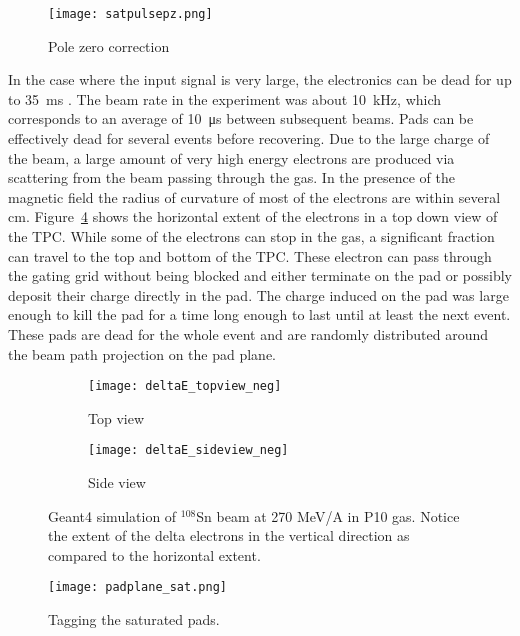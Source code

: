 \begin{figure}[!htb]
\centering
\texttt{[image: satpulsepz.png]} 
\caption{Pole zero correction} 
\label{fig:pulseSatTag}
\end{figure}


In the case where the input signal is very large, the electronics can be dead for up to \SI{35}{\milli\second} \cite{akiGET}. The beam rate in the experiment was about \SI{10}{\kilo\hertz}, which corresponds to an average of \SI{10}{\micro\second} between subsequent beams. Pads can be effectively dead for several events before recovering. Due to the large charge of the beam, a large amount of very high energy electrons are produced via scattering from the beam passing through the gas. In the presence of the magnetic field the radius of curvature of most of the electrons are within several \si{cm}. Figure~\ref{fig:deltaE} shows the horizontal extent of the electrons in a top down view of the TPC. While some of the electrons can stop in the gas, a significant fraction can travel to the top and bottom of the TPC. These electron can pass through the gating grid without being blocked and either terminate on the pad or possibly deposit their charge directly in the pad. The charge induced on the pad was large enough to kill the pad for a time long enough to last until at least the next event. These pads are dead for the whole event and are randomly distributed around the beam path projection on the pad plane. 


\begin{figure}[!htb]
    \centering
    \begin{subfigure}[t]{0.49\textwidth}
        \centering
        \texttt{[image: deltaE\_topview\_neg]} 
        \caption{Top view} \label{fig:deltaE_topview}
    \end{subfigure}
    \hfill
    \begin{subfigure}[t]{0.49\textwidth}
        \centering
        \texttt{[image: deltaE\_sideview\_neg]} 
        \caption{Side view} \label{fig:deltaE_sideview}
    \end{subfigure}
    \caption{Geant4 simulation of ${}^{108}$Sn beam at 270 MeV/A in P10 gas. Notice the extent of the delta electrons in the vertical direction as compared to the horizontal extent. }
\label{fig:deltaE}
\end{figure}


\begin{figure}[!htb]
\texttt{[image: padplane\_sat.png]}
\caption{Tagging the saturated pads.}
\label{fig:satTag}
\end{figure}

